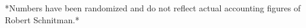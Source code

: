 
\newpage

*Numbers have been randomized and do not reflect actual accounting figures of Robert Schnitman.*